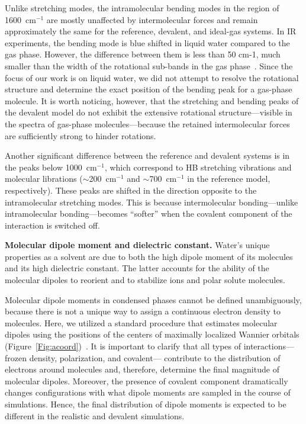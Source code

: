 \documentclass[journal=jacsat,manuscript=article]{achemso}
\begin{document}
Unlike stretching modes, the intramolecular bending modes in the region of 1600~cm$^{-1}$ are mostly unaffected by intermolecular forces and remain approximately the same for the reference, devalent, and ideal-gas systems. 
In IR experiments, the bending mode is blue shifted in liquid water compared to the gas phase. However, the difference between them is less than 50 cm-1, much smaller than the width of the rotational sub-bands in the gas phase~\cite{ZZZ-the-HB-book}. Since the focus of our work is on liquid water, we did not attempt to resolve the rotational structure and determine the exact position of the bending peak for a gas-phase molecule.
It is worth noticing, however, that the stretching and bending peaks of the devalent model do not exhibit the extensive rotational structure---visible in the spectra of gas-phase molecules---because the retained intermolecular forces are sufficiently strong to hinder rotations.

Another significant difference between the reference and devalent systems is in the peaks below 1000~cm$^{-1}$, which correspond to HB stretching vibrations and molecular librations ($\sim$200~cm$^{-1}$ and $\sim$700~cm$^{-1}$ in the reference model, respectively). These peaks are shifted in the direction opposite to the intramolecular stretching modes. This is because intermolecular bonding---unlike intramolecular bonding---becomes ``softer'' when the covalent component of the interaction is switched off.%

\textbf{Molecular dipole moment and dielectric constant.} Water's unique properties as a solvent are due to both the high dipole moment of its molecules and its high dielectric constant. 
The latter accounts for the ability of the molecular dipoles to reorient and to stabilize ions and polar solute molecules. 


Molecular dipole moments in condensed phases cannot be defined unambiguously, because there is not a unique way to assign a continuous electron density to molecules.
Here, we utilized a standard procedure that estimates molecular dipoles using the positions of the centers of maximally localized Wannier orbitals (Figure~\ref{Fig:acoord})~\cite{marzari1997maximally,sharma2007dipolar}. 
It is important to clarify that all types of interactions---frozen density, polarization, and covalent--- contribute to the distribution of electrons around molecules and, therefore, determine the final magnitude of molecular dipoles. 
Moreover, the presence of covalent component dramatically changes configurations with what dipole moments are sampled in the course of simulations. 
Hence, the final distribution of dipole moments is expected to be different in the realistic and devalent simulations. 
\end{document}
